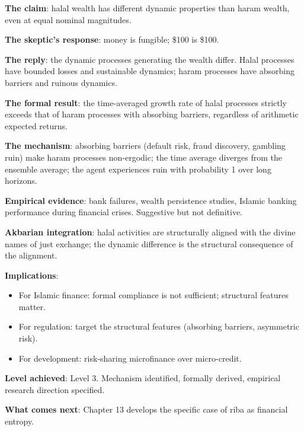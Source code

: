 \begin{summarybox}
\textbf{The claim}: halal wealth has different dynamic properties
than haram wealth, even at equal nominal magnitudes.

\textbf{The skeptic's response}: money is fungible; \$100 is \$100.

\textbf{The reply}: the dynamic processes generating the wealth
differ. Halal processes have bounded losses and sustainable
dynamics; haram processes have absorbing barriers and ruinous
dynamics.

\textbf{The formal result}: the time-averaged growth rate of halal
processes strictly exceeds that of haram processes with absorbing
barriers, regardless of arithmetic expected returns.

\textbf{The mechanism}: absorbing barriers (default risk, fraud
discovery, gambling ruin) make haram processes non-ergodic; the
time average diverges from the ensemble average; the agent
experiences ruin with probability 1 over long horizons.

\textbf{Empirical evidence}: bank failures, wealth persistence
studies, Islamic banking performance during financial crises.
Suggestive but not definitive.

\textbf{Akbarian integration}: halal activities are structurally
aligned with the divine names of just exchange; the dynamic
difference is the structural consequence of the alignment.

\textbf{Implications}:
\begin{itemize}[leftmargin=1.5em]
    \item For Islamic finance: formal compliance is not sufficient;
    structural features matter.
    \item For regulation: target the structural features
    (absorbing barriers, asymmetric risk).
    \item For development: risk-sharing microfinance over
    micro-credit.
\end{itemize}

\textbf{Level achieved}: Level 3. Mechanism identified, formally
derived, empirical research direction specified.

\textbf{What comes next}: Chapter 13 develops the specific case of
riba as financial entropy.
\end{summarybox}

\cleardoublepage
